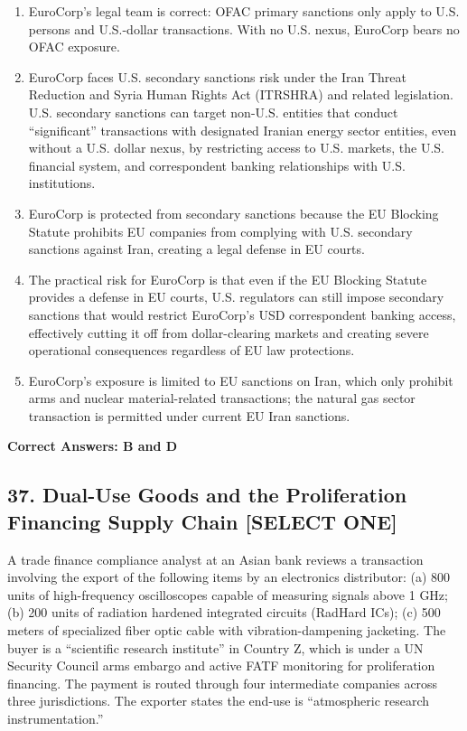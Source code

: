\documentclass[11pt,a4paper]{article}
\begin{document}
	\begin{enumerate}[label=\Alph*.]
		\item EuroCorp's legal team is correct: OFAC primary sanctions only apply to U.S. persons and U.S.-dollar transactions. With no U.S. nexus, EuroCorp bears no OFAC exposure.
		\item EuroCorp faces U.S. secondary sanctions risk under the Iran Threat Reduction and Syria Human Rights Act (ITRSHRA) and related legislation. U.S. secondary sanctions can target non-U.S. entities that conduct ``significant'' transactions with designated Iranian energy sector entities, even without a U.S. dollar nexus, by restricting access to U.S. markets, the U.S. financial system, and correspondent banking relationships with U.S. institutions.
		\item EuroCorp is protected from secondary sanctions because the EU Blocking Statute prohibits EU companies from complying with U.S. secondary sanctions against Iran, creating a legal defense in EU courts.
		\item The practical risk for EuroCorp is that even if the EU Blocking Statute provides a defense in EU courts, U.S. regulators can still impose secondary sanctions that would restrict EuroCorp's USD correspondent banking access, effectively cutting it off from dollar-clearing markets and creating severe operational consequences regardless of EU law protections.
		\item EuroCorp's exposure is limited to EU sanctions on Iran, which only prohibit arms and nuclear material-related transactions; the natural gas sector transaction is permitted under current EU Iran sanctions.
	\end{enumerate}
	\textbf{Correct Answers: B and D}
	
	\subsection{37. Dual-Use Goods and the Proliferation Financing Supply Chain \textnormal{[SELECT ONE]}}
	
	A trade finance compliance analyst at an Asian bank reviews a transaction involving the export of the following items by an electronics distributor: (a) 800 units of high-frequency oscilloscopes capable of measuring signals above 1 GHz; (b) 200 units of radiation hardened integrated circuits (RadHard ICs); (c) 500 meters of specialized fiber optic cable with vibration-dampening jacketing. The buyer is a ``scientific research institute'' in Country Z, which is under a UN Security Council arms embargo and active FATF monitoring for proliferation financing. The payment is routed through four intermediate companies across three jurisdictions. The exporter states the end-use is ``atmospheric research instrumentation.''
	
\end{document}
